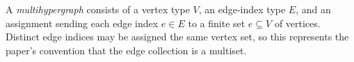 \begin{definition}
A \emph{multihypergraph} consists of a vertex type $V$, an edge-index type
$E$, and an assignment sending each edge index $e\in E$ to a finite set
$e\subseteq V$ of vertices.  Distinct edge indices may be assigned the same
vertex set, so this represents the paper's convention that the edge collection
is a multiset.
\end{definition}
